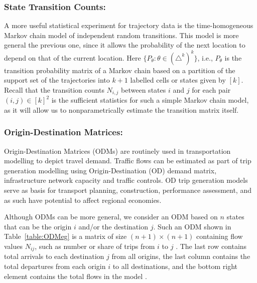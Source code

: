 \subsubsection{State Transition Counts:}
A more useful statistical experiment for trajectory data is the time-homogeneous Markov chain model of independent random transitions. This model is more general the previous one, since it allows the probability of the next location to depend on that of the current location.   
Here $\{P_{\theta}: \theta \in (\triangle^k)^k\}$, i.e., $P_{\theta}$ is the transition probability matrix of a Markov chain based on a partition of the support set of the trajectories into $k+1$ labelled cells or states given by $[k]$.  
Recall that the transition counts $N_{i,j}$ between states $i$ and $j$ for each pair $(i,j) \in [k]^2$ is the sufficient statistics for such a simple Markov chain model, as it will allow us to nonparametrically estimate the transition matrix itself.  

\subsubsection{Origin-Destination Matrices:}
Origin-Destination Matrices (ODMs) are routinely used in transportation modelling to depict travel demand.  
Traffic flows can be estimated as part of trip generation modelling using Origin-Destination (OD) demand matrix, infrastructure network capacity and traffic controls. 
OD trip generation models serve as basis for transport planning, construction, performance assessment, and as such have potential to affect regional economies. 

Although ODMs can be more general, we consider an ODM based on $n$ states that can be the origin $i$ and/or the destination $j$. 
Such an ODM shown in Table~\ref{table:ODMeg} is a matrix of size $(n+1) \times (n+1)$ containing flow values $N_{ij}$, such as number or share of trips from $i$ to $j$ \citep{Rodrigue2009}.  
The last row contains total arrivals to each destination $j$ from all origins, the last column contains the total departures from each origin $i$ to all destinations, and the bottom right element contains the total flows in the model 
\citep{EVANS1970}.

